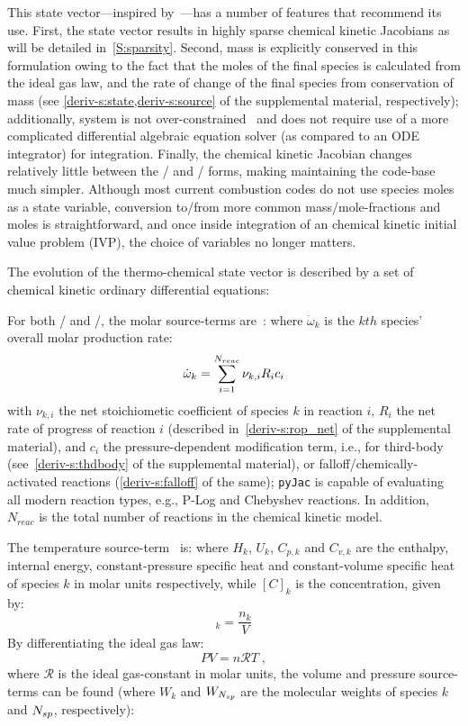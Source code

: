 \documentclass[12pt,number,sort&compress,preprint]{elsarticle}
\begin{document}
This state vector---inspired by~\cite{SCHWER2002270}---has a number of features that recommend its use.
First, the state vector results in highly sparse chemical kinetic Jacobians as will be detailed in~\cref{S:sparsity}.
Second, mass is explicitly conserved in this formulation owing to the fact that the moles of the final species is calculated from the ideal gas law, and the rate of change of the final species from conservation of mass (see \cref{deriv-s:state,deriv-s:source} of the supplemental material, respectively); additionally, system is not over-constrained~\cite{HANSEN2018257} and does not require use of a more complicated differential algebraic equation solver (as compared to an ODE integrator) for integration.
Finally, the chemical kinetic Jacobian changes relatively little between the \conp/ and \conv/ forms, making maintaining the code-base much simpler.
Although most current combustion codes do not use species moles as a state variable, conversion to\slash from more common mass\slash mole-fractions and moles is straightforward, and once inside integration of an chemical kinetic initial value problem (IVP), the choice of variables no longer matters.

The evolution of the thermo-chemical state vector is described by a set of chemical kinetic ordinary differential equations:

For both \conp/ and \conv/, the molar source-terms are~\cite{TurnsStephenR2012Aitc}:
where $\dot{\omega}_k$ is the $kth$ species' overall molar production rate:
\begin{equation}
 \dot{\omega}_{k} = \sum_{i=1}^{\nr/} \nu_{k, i} R_{i} c_{i}
\end{equation}
with $\nu_{k, i}$ the net stoichiometic coefficient of species $k$ in reaction $i$, $R_{i}$ the net rate of progress of reaction $i$ (described in~\cref{deriv-s:rop_net} of the supplemental material), and $c_{i}$ the pressure-dependent modification term, i.e., for third-body (see~\cref{deriv-s:thdbody} of the supplemental material), or falloff\slash chemically-activated reactions (\cref{deriv-s:falloff} of the same); \texttt{pyJac} is capable of evaluating all modern reaction types, e.g., P-Log and Chebyshev reactions.
In addition, $N_{reac}$ is the total number of reactions in the chemical kinetic model.

The temperature source-term~\cite{TurnsStephenR2012Aitc} is:
where $H_k$, $U_k$, $C_{p,k}$ and $C_{v, k}$ are the enthalpy, internal energy, constant-pressure specific heat and constant-volume specific heat of species $k$ in molar units respectively, while $[C]_{k}$ is the concentration, given by:
\begin{equation}
 [C]_{k} = \frac{n_{k}}{V}
\end{equation}
By differentiating the ideal gas law:
\begin{equation}
 PV = n\mathcal{R}T \;,
\end{equation}
where $\mathcal{R}$ is the ideal gas-constant in molar units, the volume and pressure source-terms can be found (where $W_k$ and $W_{\ns/}$ are the molecular weights of species $k$ and $\ns/$, respectively):
\end{document}
